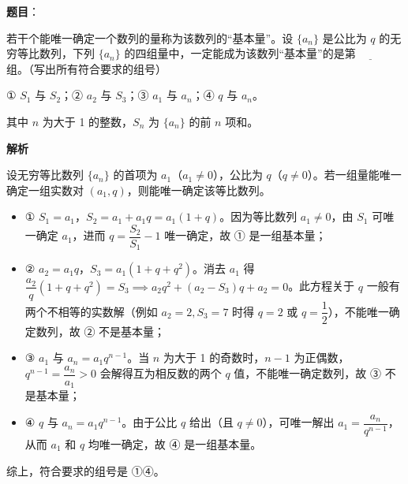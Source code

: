 \begin{answer}

\textbf{题目}：

若干个能唯一确定一个数列的量称为该数列的“基本量”。设 $\{a_n\}$ 是公比为 $q$ 的无穷等比数列，下列 $\{a_n\}$ 的四组量中，一定能成为该数列“基本量”的是第 $\underline{\qquad}$ 组。（写出所有符合要求的组号）

① $S_1$ 与 $S_2$；② $a_2$ 与 $S_3$；③ $a_1$ 与 $a_n$；④ $q$ 与 $a_n$。

其中 $n$ 为大于 1 的整数，$S_n$ 为 $\{a_n\}$ 的前 $n$ 项和。

\textbf{解析}

设无穷等比数列 $\{a_n\}$ 的首项为 $a_1$（$a_1 \ne 0$），公比为 $q$（$q \ne 0$）。若一组量能唯一确定一组实数对 $(a_1, q)$，则能唯一确定该等比数列。
\begin{itemize}
\item ① $S_1 = a_1$，$S_2 = a_1 + a_1 q = a_1(1 + q)$。因为等比数列 $a_1 \ne 0$，由 $S_1$ 可唯一确定 $a_1$，进而 $q = \dfrac{S_2}{S_1} - 1$ 唯一确定，故 ① 是一组基本量；
\item ② $a_2 = a_1 q$，$S_3 = a_1(1 + q + q^2)$。消去 $a_1$ 得 $\dfrac{a_2}{q}(1 + q + q^2) = S_3 \implies a_2 q^2 + (a_2 - S_3)q + a_2 = 0$。此方程关于 $q$ 一般有两个不相等的实数解（例如 $a_2 = 2, S_3 = 7$ 时得 $q = 2$ 或 $q = \dfrac{1}{2}$），不能唯一确定数列，故 ② 不是基本量；
\item ③ $a_1$ 与 $a_n = a_1 q^{n-1}$。当 $n$ 为大于 1 的奇数时，$n - 1$ 为正偶数，$q^{n-1} = \dfrac{a_n}{a_1} > 0$ 会解得互为相反数的两个 $q$ 值，不能唯一确定数列，故 ③ 不是基本量；
\item ④ $q$ 与 $a_n = a_1 q^{n-1}$。由于公比 $q$ 给出（且 $q \ne 0$），可唯一解出 $a_1 = \dfrac{a_n}{q^{n-1}}$，从而 $a_1$ 和 $q$ 均唯一确定，故 ④ 是一组基本量。
\end{itemize}

综上，符合要求的组号是 ①④。


\end{answer}
